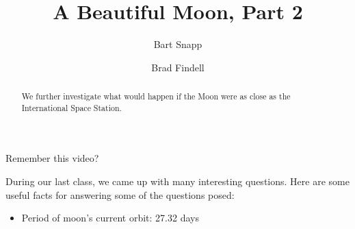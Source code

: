 \documentclass{ximera}
\title{A Beautiful Moon, Part 2}
\author{Bart Snapp \and Brad Findell}
\begin{document}
\begin{abstract}
We further investigate what would happen if the Moon were as close as the
International Space Station.
\end{abstract}
\maketitle
Remember this video?  

\begin{problem}
 During our last class, we came up with many interesting questions.   %
%
%
%
Here are some useful facts for answering some of the questions posed:   
\begin{itemize}
\item Period of moon's current orbit:  27.32 days

\end{itemize}
\end{problem}
\end{document}
